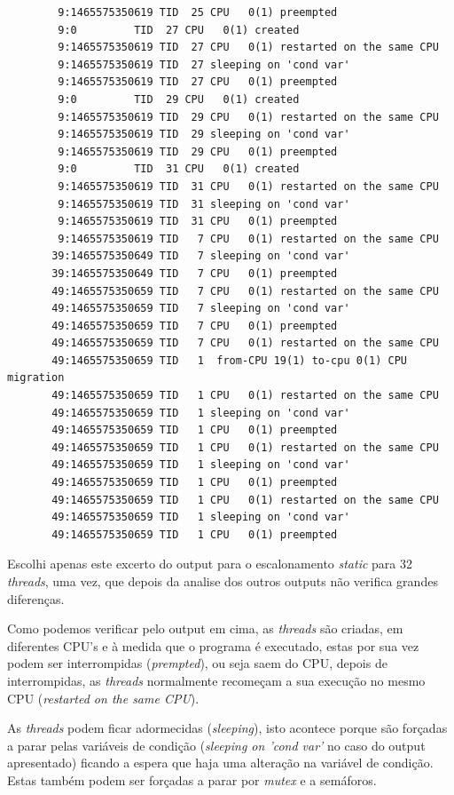 \documentclass[conference,compsoc]{IEEEtran}
\begin{document}
\begin{lstlisting}
        9:1465575350619 TID  25 CPU   0(1) preempted
        9:0         TID  27 CPU   0(1) created
        9:1465575350619 TID  27 CPU   0(1) restarted on the same CPU
        9:1465575350619 TID  27 sleeping on 'cond var'
        9:1465575350619 TID  27 CPU   0(1) preempted
        9:0         TID  29 CPU   0(1) created
        9:1465575350619 TID  29 CPU   0(1) restarted on the same CPU
        9:1465575350619 TID  29 sleeping on 'cond var'
        9:1465575350619 TID  29 CPU   0(1) preempted
        9:0         TID  31 CPU   0(1) created
        9:1465575350619 TID  31 CPU   0(1) restarted on the same CPU
        9:1465575350619 TID  31 sleeping on 'cond var'
        9:1465575350619 TID  31 CPU   0(1) preempted
        9:1465575350619 TID   7 CPU   0(1) restarted on the same CPU
       39:1465575350649 TID   7 sleeping on 'cond var'
       39:1465575350649 TID   7 CPU   0(1) preempted
       49:1465575350659 TID   7 CPU   0(1) restarted on the same CPU
       49:1465575350659 TID   7 sleeping on 'cond var'
       49:1465575350659 TID   7 CPU   0(1) preempted
       49:1465575350659 TID   7 CPU   0(1) restarted on the same CPU
       49:1465575350659 TID   1  from-CPU 19(1) to-cpu 0(1) CPU migration
       49:1465575350659 TID   1 CPU   0(1) restarted on the same CPU
       49:1465575350659 TID   1 sleeping on 'cond var'
       49:1465575350659 TID   1 CPU   0(1) preempted
       49:1465575350659 TID   1 CPU   0(1) restarted on the same CPU
       49:1465575350659 TID   1 sleeping on 'cond var'
       49:1465575350659 TID   1 CPU   0(1) preempted
       49:1465575350659 TID   1 CPU   0(1) restarted on the same CPU
       49:1465575350659 TID   1 sleeping on 'cond var'
       49:1465575350659 TID   1 CPU   0(1) preempted
\end{lstlisting}

Escolhi apenas este excerto do output para o escalonamento \textit{static} para 32 \textit{threads}, uma vez, que depois da analise dos outros outputs não verifica grandes diferenças.

Como podemos verificar pelo output em cima, as \textit{threads} são criadas, em diferentes CPU's e à medida que o programa é executado, estas por sua vez podem ser interrompidas (\textit{prempted}), ou seja saem do CPU, depois de interrompidas, as \textit{threads} normalmente recomeçam a sua execução no mesmo CPU (\textit{restarted on the same CPU}). 

As \textit{threads} podem ficar adormecidas (\textit{sleeping}), isto acontece porque são forçadas a parar pelas variáveis de condição (\textit{sleeping on 'cond var'} no caso do output apresentado) ficando a espera que haja uma alteração na variável de condição. Estas também podem ser forçadas a parar por \textit{mutex} e a semáforos.
\end{document}
